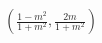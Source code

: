 \documentclass[preview]{standalone}
\begin{document}
\begin{align*}
\left( \frac{1-m^{2}}{1+m^{2}},\frac{2m}{1+m^{2}} \right)
\end{align*}
\end{document}
